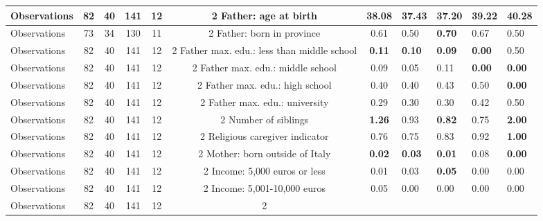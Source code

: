 \begin{tabular}{l c c c c c c }
\midrule
Observations &        82 &        40 &       141 &        12 &         2
Father: age at birth & \textbf{    38.08} & \textbf{    37.43} & \textbf{    37.20} & \textbf{    39.22} &     40.28 \\
\midrule
Observations &        73 &        34 &       130 &        11 &         2
Father: born in province &      0.61 &      0.50 & \textbf{     0.70} &      0.67 &      0.50 \\
\midrule
Observations &        82 &        40 &       141 &        12 &         2
Father max. edu.: less than middle school & \textbf{     0.11} & \textbf{     0.10} & \textbf{     0.09} & \textbf{     0.00} &      0.50 \\
\midrule
Observations &        82 &        40 &       141 &        12 &         2
Father max. edu.: middle school &      0.09 &      0.05 &      0.11 & \textbf{     0.00} & \textbf{     0.00} \\
\midrule
Observations &        82 &        40 &       141 &        12 &         2
Father max. edu.: high school &      0.40 &      0.40 &      0.43 &      0.50 & \textbf{     0.00} \\
\midrule
Observations &        82 &        40 &       141 &        12 &         2
Father max. edu.: university &      0.29 &      0.30 &      0.30 &      0.42 &      0.50 \\
\midrule
Observations &        82 &        40 &       141 &        12 &         2
Number of siblings & \textbf{     1.26} &      0.93 & \textbf{     0.82} &      0.75 & \textbf{     2.00} \\
\midrule
Observations &        82 &        40 &       141 &        12 &         2
Religious caregiver indicator &      0.76 &      0.75 &      0.83 &      0.92 & \textbf{     1.00} \\
\midrule
Observations &        82 &        40 &       141 &        12 &         2
Mother: born outside of Italy & \textbf{     0.02} & \textbf{     0.03} & \textbf{     0.01} &      0.08 & \textbf{     0.00} \\
\midrule
Observations &        82 &        40 &       141 &        12 &         2
Income: 5,000 euros or less &      0.01 &      0.03 & \textbf{     0.05} &      0.00 &      0.00 \\
\midrule
Observations &        82 &        40 &       141 &        12 &         2
Income: 5,001-10,000 euros &      0.05 &      0.00 &      0.00 &      0.00 &      0.00 \\
\midrule
Observations &        82 &        40 &       141 &        12 &         2

\end{tabular}
